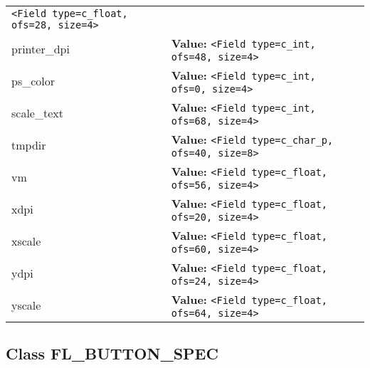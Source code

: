 \begin{longtable}{|p{\varnamewidth}|p{\vardescrwidth}|l}
{\tt {\textless}Field type=c\_float, ofs=28, size=4{\textgreater}}&\\
\cline{1-2}
\raggedright p\-r\-i\-n\-t\-e\-r\-\_\-d\-p\-i\- & \raggedright \textbf{Value:} 
{\tt {\textless}Field type=c\_int, ofs=48, size=4{\textgreater}}&\\
\cline{1-2}
\raggedright p\-s\-\_\-c\-o\-l\-o\-r\- & \raggedright \textbf{Value:} 
{\tt {\textless}Field type=c\_int, ofs=0, size=4{\textgreater}}&\\
\cline{1-2}
\raggedright s\-c\-a\-l\-e\-\_\-t\-e\-x\-t\- & \raggedright \textbf{Value:} 
{\tt {\textless}Field type=c\_int, ofs=68, size=4{\textgreater}}&\\
\cline{1-2}
\raggedright t\-m\-p\-d\-i\-r\- & \raggedright \textbf{Value:} 
{\tt {\textless}Field type=c\_char\_p, ofs=40, size=8{\textgreater}}&\\
\cline{1-2}
\raggedright v\-m\- & \raggedright \textbf{Value:} 
{\tt {\textless}Field type=c\_float, ofs=56, size=4{\textgreater}}&\\
\cline{1-2}
\raggedright x\-d\-p\-i\- & \raggedright \textbf{Value:} 
{\tt {\textless}Field type=c\_float, ofs=20, size=4{\textgreater}}&\\
\cline{1-2}
\raggedright x\-s\-c\-a\-l\-e\- & \raggedright \textbf{Value:} 
{\tt {\textless}Field type=c\_float, ofs=60, size=4{\textgreater}}&\\
\cline{1-2}
\raggedright y\-d\-p\-i\- & \raggedright \textbf{Value:} 
{\tt {\textless}Field type=c\_float, ofs=24, size=4{\textgreater}}&\\
\cline{1-2}
\raggedright y\-s\-c\-a\-l\-e\- & \raggedright \textbf{Value:} 
{\tt {\textless}Field type=c\_float, ofs=64, size=4{\textgreater}}&\\
\cline{1-2}
\end{longtable}



\subsection{Class FL\_BUTTON\_SPEC}

